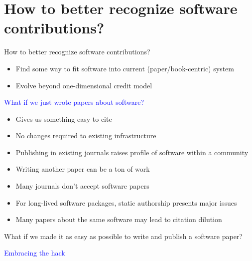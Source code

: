 \section{How to better recognize software
contributions?}

\begin{frame}{How to better recognize software
contributions?}

\begin{itemize}
    \item Find some way to fit software into
current (paper/book-centric)
system
    \item  Evolve beyond one-dimensional
credit model
\end{itemize}

\begin{center}
    \textcolor{blue}{What if we just wrote papers about software?}
\end{center}

\begin{itemize}
    \item<only@1> Gives us something easy to cite 
    \item<only@1> No changes required to existing
infrastructure 
    \item<only@1> Publishing in existing journals raises
profile of software within a community 
%
    \item<2> Writing another paper can be a ton of
work 
    \item<2> Many journals don’t accept software
papers 
    \item<2> For long-lived software packages, static
authorship presents major issues 
    \item<2> Many papers about the same software
may lead to citation dilution 
\end{itemize}

    
\end{frame}

\begin{frame}

\begin{center}
What if we made it as easy as
possible to write and publish a
software paper?
\end{center}

\begin{center}
   \textcolor{blue}{Embracing the hack}
\end{center}

\end{frame}

